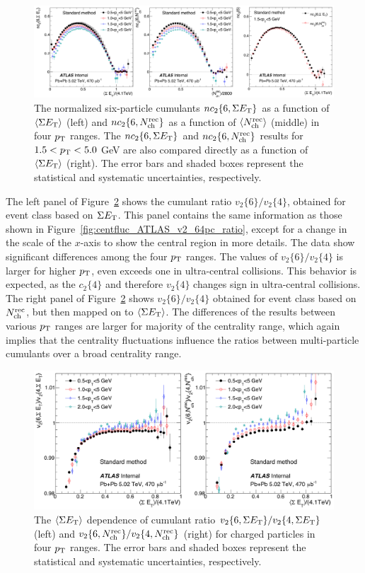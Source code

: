 \begin{figure}[H]
\centering
\includegraphics[width=.95\linewidth]{figs/chapter_centfluc/ATLAS_nc_6pc_cf.png}
\caption{The normalized six-particle cumulants $nc_2\{6, \Sigma E_\text{T}\}$ as a function of $\left\langle \Sigma E_\text{T}\right\rangle$ (left) and $nc_2\{6, N_\text{ch}^\text{rec}\}$ as a function of $\left\langle N_\text{ch}^\text{rec}\right\rangle$ (middle) in four $p_\text{T}$ ranges. The $nc_2\{6, \Sigma E_\text{T}\}$ and $nc_2\{6, N_\text{ch}^\text{rec}\}$ results for $1.5<p_\text{T}<5.0$ GeV are also compared directly as a function of $\left\langle \Sigma E_\text{T}\right\rangle$ (right). The error bars and shaded boxes represent the statistical and systematic uncertainties, respectively.}
\label{fig:centfluc_ATLAS_nc_6pc_cf}
\end{figure}

The left panel of Figure~\ref{fig:centfluc_ATLAS_v2_64pc_ratio_cf} shows the cumulant ratio $v_2\{6\} / v_2\{4\}$, obtained for event class based on $\Sigma E_\text{T}$. This panel contains the same information as those shown in Figure~\ref{fig:centfluc_ATLAS_v2_64pc_ratio}, except for a change in the scale of the $x$-axis to show the central region in more details. The data show significant differences among the four $p_\text{T}$ ranges. The values of $v_2\{6\} / v_2\{4\}$ is larger for higher $p_\text{T}$, even exceeds one in ultra-central collisions. This behavior is expected, as the $c_2\{4\}$ and therefore $v_2\{4\}$ changes sign in ultra-central collisions. The right panel of Figure~\ref{fig:centfluc_ATLAS_v2_64pc_ratio_cf} shows $v_2\{6\} / v_2\{4\}$ obtained for event class based on $N_\text{ch}^\text{rec}$, but then mapped on to $\left\langle \Sigma E_\text{T}\right\rangle$. The differences of the results between various $p_\text{T}$ ranges are larger for majority of the centrality range, which again implies that the centrality fluctuations influence the ratios between multi-particle cumulants over a broad centrality range.

\begin{figure}[H]
\centering
\includegraphics[width=.95\linewidth]{figs/chapter_centfluc/ATLAS_v2_64pc_ratio_cf.png}
\caption{The $\left\langle \Sigma E_\text{T}\right\rangle$ dependence of cumulant ratio $v_2\{6, \Sigma E_\text{T}\} / v_2\{4, \Sigma E_\text{T}\}$ (left) and $v_2\{6, N_\text{ch}^\text{rec}\} / v_2\{4, N_\text{ch}^\text{rec}\}$ (right) for charged particles in four $p_\text{T}$ ranges. The error bars and shaded boxes represent the statistical and systematic uncertainties, respectively.}
\label{fig:centfluc_ATLAS_v2_64pc_ratio_cf}
\end{figure}

